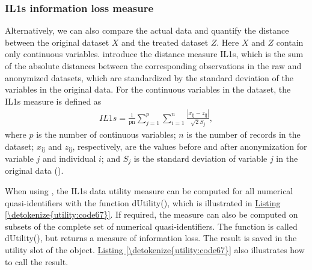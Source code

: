 \documentclass[letterpaper,10pt,english]{sphinxmanual}
\begin{document}
\subsubsection{IL1s information loss measure}
\label{\detokenize{utility:il1s-information-loss-measure}}
Alternatively, we can also compare the actual data and quantify the
distance between the original dataset \(X\) and the treated dataset
\(Z\). Here \(X\) and \(Z\) contain only continuous
variables. {\hyperref[\detokenize{utility:yawc02}]{}} introduce the distance
measure IL1s, which is the sum of the absolute distances between the
corresponding observations in the raw and anonymized datasets, which are
standardized by the standard deviation of the variables in the original
data. For the continuous variables in the dataset, the IL1s measure is
defined as
\begin{equation*}
\begin{split}IL1s = \frac{1}{\text{pn}}\sum_{j = 1}^{p}{\sum_{i = 1}^{n}\frac{\left| x_{\text{ij}} - z_{\text{ij}} \right|}{\sqrt{2}S_{j}}},\end{split}
\end{equation*}
where \(p\) is the number of continuous variables; \(n\) is the
number of records in the dataset; \(x_{\text{ij}}\) and
\(z_{\text{ij}}\), respectively, are the values before and after
anonymization for variable \(j\) and individual \(i\); and
\(S_{j}\) is the standard deviation of variable \(j\) in the
original data ({\hyperref[\detokenize{utility:yawc02}]{}}).

When using , the IL1s data utility measure can be computed for
all numerical quasi-identifiers with the function dUtility(), which is
illustrated in \hyperref[\detokenize{utility:code67}]{Listing \ref{\detokenize{utility:code67}}}. If required, the measure can also be
computed on subsets of the complete set of numerical quasi-identifiers.
The function is called dUtility(), but returns a measure of information
loss. The result is saved in the utility slot of the  object.
\hyperref[\detokenize{utility:code67}]{Listing \ref{\detokenize{utility:code67}}} also illustrates how to call the result.
\end{document}
